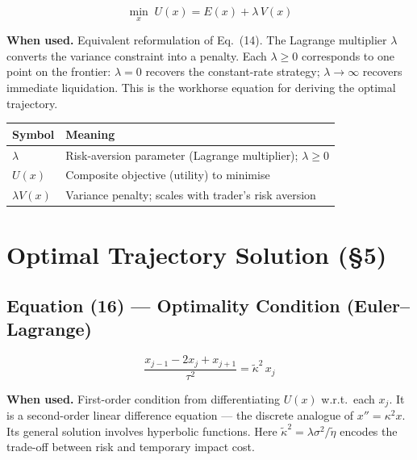 \documentclass[11pt,a4paper]{article}
\begin{document}
\begin{equation}
  \min_x\; U(x) = E(x) + \lambda\,V(x)
\end{equation}

\textbf{When used.} Equivalent reformulation of Eq.~(14).  The Lagrange multiplier
$\lambda$ converts the variance constraint into a penalty.  Each $\lambda\geq 0$
corresponds to one point on the frontier: $\lambda=0$ recovers the constant-rate
strategy; $\lambda\to\infty$ recovers immediate liquidation.  This is the workhorse
equation for deriving the optimal trajectory.

\begin{center}
\begin{tabular}{@{}L{3.5cm}L{10cm}@{}}
\toprule
\textbf{Symbol} & \textbf{Meaning} \\
\midrule
$\lambda$ & Risk-aversion parameter (Lagrange multiplier); $\lambda \geq 0$ \\
$U(x)$ & Composite objective (utility) to minimise \\
$\lambda V(x)$ & Variance penalty; scales with trader's risk aversion \\
\bottomrule
\end{tabular}
\end{center}

\section{Optimal Trajectory Solution (\texorpdfstring{\S}{§}5)}

\subsection*{Equation (16) — Optimality Condition (Euler--Lagrange)}

\begin{equation}
  \frac{x_{j-1} - 2x_j + x_{j+1}}{\tau^2} = \tilde{\kappa}^2\,x_j
\end{equation}

\textbf{When used.} First-order condition from differentiating $U(x)$ w.r.t.\ each $x_j$.
It is a second-order linear difference equation — the discrete analogue of $x''=\kappa^2 x$.
Its general solution involves hyperbolic functions.  Here
$\tilde{\kappa}^2 = \lambda\sigma^2/\tilde{\eta}$ encodes the trade-off between risk and
temporary impact cost.
\end{document}
